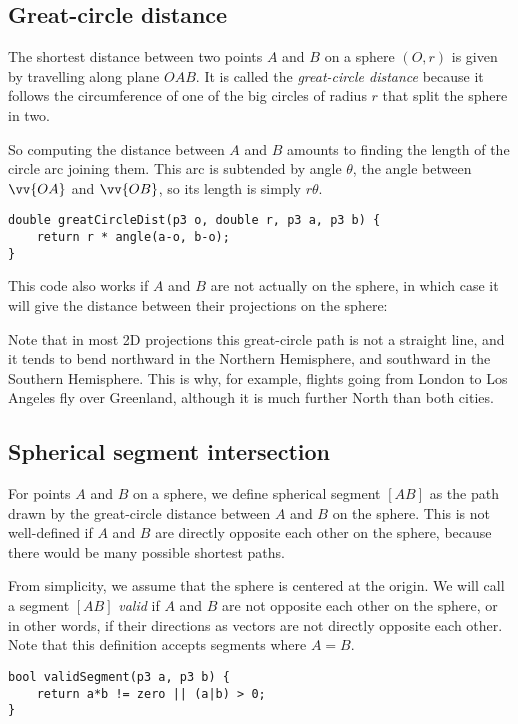 \subsection{Great-circle distance}
The shortest distance between two points $A$ and $B$ on a sphere $(O,r)$ is given by travelling along plane $OAB$. It is called the \emph{great-circle distance} because it follows the circumference of one of the big circles of radius $r$ that split the sphere in two.


So computing the distance between $A$ and $B$ amounts to finding the length of the circle arc joining them. This arc is subtended by angle $\theta$, the angle between $\vv{OA}$ and $\vv{OB}$, so its length is simply $r\theta$.
\begin{lstlisting}
double greatCircleDist(p3 o, double r, p3 a, p3 b) {
    return r * angle(a-o, b-o);
}
\end{lstlisting}

This code also works if $A$ and $B$ are not actually on the sphere, in which case it will give the distance between their projections on the sphere:


Note that in most 2D projections this great-circle path is not a straight line, and it tends to bend northward in the Northern Hemisphere, and southward in the Southern Hemisphere. This is why, for example, flights going from London to Los Angeles fly over Greenland, although it is much further North than both cities.


\subsection{Spherical segment intersection}
For points $A$ and $B$ on a sphere, we define spherical segment $[AB]$ as the path drawn by the great-circle distance between $A$ and $B$ on the sphere. This is not well-defined if $A$ and $B$ are directly opposite each other on the sphere, because there would be many possible shortest paths.

From simplicity, we assume that the sphere is centered at the origin. 
We will call a segment $[AB]$ \emph{valid} if $A$ and $B$ are not opposite each other on the sphere, or in other words, if their directions as vectors are not directly opposite each other. Note that this definition accepts segments where $A=B$.
\begin{lstlisting}
bool validSegment(p3 a, p3 b) {
    return a*b != zero || (a|b) > 0;
}
\end{lstlisting}

